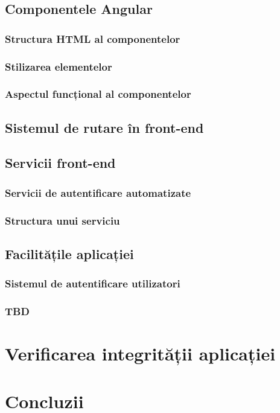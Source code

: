 \documentclass[12pt,a4paper]{report}
\theoremstyle{definition}
\theoremstyle{remark}
\begin{document}
\newpage

\section{Componentele Angular}

\subsection{Structura HTML al componentelor}

\subsection{Stilizarea elementelor}

\subsection{Aspectul funcțional al componentelor}

\newpage

\section{Sistemul de rutare în front-end}

\newpage

\section{Servicii front-end}

\subsection{Servicii de autentificare automatizate}

\subsection{Structura unui serviciu}

\newpage

\section{Facilitățile aplicației}

\subsection{Sistemul de autentificare utilizatori}

\subsection{TBD}

\chapter{Verificarea integrității aplicației}

\chapter{Concluzii}



\end{document}
